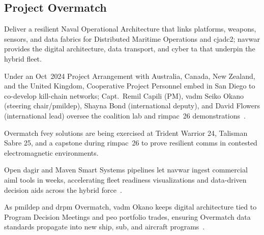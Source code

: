 \documentclass[../main.tex]{subfiles}
\begin{document}
\subsection{Project Overmatch}
\begin{description}[style=nextline,labelsep=0.5em,font=\bfseries]
  \item[\textbf{Mission.}] Deliver a resilient Naval Operational Architecture that links platforms, weapons, sensors, and data fabrics for Distributed Maritime Operations and \ac{cjadc2}; \ac{navwar} provides the digital architecture, data transport, and cyber \ac{ta} that underpin the hybrid fleet.
  \item[\textbf{Five Eyes coalition network.}] Under an Oct~2024 Project Arrangement with Australia, Canada, New Zealand, and the United Kingdom, Cooperative Project Personnel embed in San Diego to co-develop kill-chain networks; Capt.\ Remil Capili (PM), \ac{vadm} Seiko Okano (steering chair/\ac{pmildep}), Shayna Bond (international deputy), and David Flowers (international lead) oversee the coalition lab and \ac{rimpac}~26 demonstrations~\autocite{DVIDS-Overmatch-FVEY-2025-Nov}.
  \item[\textbf{Allied exercises.}] Overmatch \ac{fvey} solutions are being exercised at Trident Warrior 24, Talisman Sabre 25, and a capstone during \ac{rimpac}~26 to prove resilient comms in contested electromagnetic environments\autocite{DVIDS-Overmatch-FVEY-2025-Nov}.
  \item[\textbf{Rapid onboarding.}] Open \ac{dagir} and Maven Smart Systems pipelines let \ac{navwar} ingest commercial \ac{aiml} tools in weeks, accelerating fleet readiness visualizations and data-driven decision aids across the hybrid force~\autocite{DVIDS-Overmatch-OpenDAGIR-2025}.
  \item[\textbf{Governance.}] As \ac{pmildep} and \ac{drpm} Overmatch, \ac{vadm} Okano keeps digital architecture tied to Program Decision Meetings and \ac{peo} portfolio trades, ensuring Overmatch data standards propagate into new ship, sub, and aircraft programs~\autocite{DVIDS-Overmatch-FVEY-2025-Nov,SECNAV5000-2G}.
\end{description}
\end{document}
